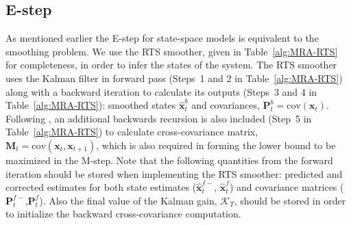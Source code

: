 \documentclass[review,authoryear,3p]{elsarticle}
\begin{document}
  \subsection{E-step}
As mentioned earlier the E-step for state-space models is equivalent to the smoothing problem. We use the RTS smoother, given in Table~\ref{alg:MRA-RTS} for completeness, in order to infer the states of the system. The RTS smoother uses the Kalman filter \cite{Kalman1960} in forward pass (Steps~1 and 2 in Table~\ref{alg:MRA-RTS}) along with a backward iteration to calculate its outputs (Steps~3 and 4 in Table~\ref{alg:MRA-RTS}): smoothed states $\hat{\mathbf x}^b_t$ and covariances, $\mathbf P^b_t=\mathrm{cov}(\mathbf{x}_t)$. Following \cite{Gibsona2005}, an additional backwards recursion is also included (Step~5 in Table~\ref{alg:MRA-RTS})	to calculate cross-covariance matrix, $\mathbf M_t=\mathrm{cov}(\mathbf{x}_{t},\mathbf{x}_{t+1})$, which is also required in forming the lower bound to be maximized in the M-step. Note that the following quantities from the forward iteration should be stored when implementing the RTS smoother: predicted and corrected estimates for both state estimates ($\hat{\mathbf{x}}_t^{f-}$, $\hat{\mathbf{x}}_t^{f}$) and covariance matrices ($\mathbf P_t^{f-}$,$\mathbf P_t^f$). Also the final value of the Kalman gain, $\mathcal K_T$, should be stored in order to initialize the backward cross-covariance computation. 
\renewcommand{\arraystretch}{1.7}
\end{document}
